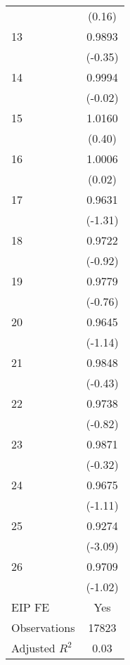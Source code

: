 {\begin{tabular}{l*{1}{c}}
                                   &      (0.16)         \\
[1em]
   13                              &      0.9893         \\
                                   &     (-0.35)         \\
[1em]
   14                              &      0.9994         \\
                                   &     (-0.02)         \\
[1em]
   15                              &      1.0160         \\
                                   &      (0.40)         \\
[1em]
   16                              &      1.0006         \\
                                   &      (0.02)         \\
[1em]
   17                              &      0.9631         \\
                                   &     (-1.31)         \\
[1em]
   18                              &      0.9722         \\
                                   &     (-0.92)         \\
[1em]
   19                              &      0.9779         \\
                                   &     (-0.76)         \\
[1em]
   20                              &      0.9645         \\
                                   &     (-1.14)         \\
[1em]
   21                              &      0.9848         \\
                                   &     (-0.43)         \\
[1em]
   22                              &      0.9738         \\
                                   &     (-0.82)         \\
[1em]
   23                              &      0.9871         \\
                                   &     (-0.32)         \\
[1em]
   24                              &      0.9675         \\
                                   &     (-1.11)         \\
[1em]
   25                              &      0.9274\sym{***}\\
                                   &     (-3.09)         \\
[1em]
   26                              &      0.9709         \\
                                   &     (-1.02)         \\
[1em]
EIP FE                             &         Yes         \\
\hline
Observations                       &       17823         \\
Adjusted \(R^{2}\)                 &        0.03         \\
\hline\hline
\end{tabular}
}
